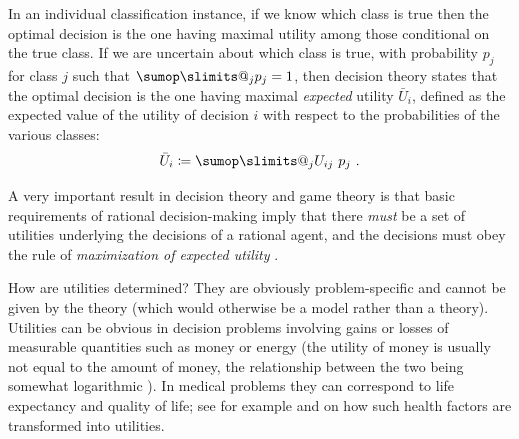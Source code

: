 \documentclass[\ifafour a4paper,12pt,\else a5paper,10pt,\fi%
onecolumn,oneside,article,%
british%
]{memoir}
\makeatletter
\theoremstyle{remark}
\theoremstyle{innote}
\def\sum{\DOTSI\sumop\slimits@}
\newcommand*{\defd}{\coloneqq}
\newcommand*{\p}{\mathrm{p}}%
\renewcommand*{\|}[1][]{\nonscript\:#1\vert\nonscript\:\mathopen{}}
\newcommand*{\sect}{\S}%
\newcommand*{\chap}{ch.}%
\newcommand*{\chaps}{chs}%
\newcommand*{\eg}{{e.g.}}
\newcommand*{\eu}{\bar{U}}
\newcommand*{\nd}{n_{\textrm{d}}}
\makeatother
\begin{document}
In an individual classification instance, if we know which class is true then the optimal decision is the one having maximal utility among those conditional on the true class. If we are uncertain about which class is true, with probability $p_{j}$ for class $j$ such that $\sum_{j}p_{j}=1$, then decision theory states that the optimal decision is the one having maximal \emph{expected} utility $\eu_{i}$, defined as the expected value of the utility of decision $i$ with respect to the probabilities of the various classes:
\begin{equation}
  \label{eq:exp_utility}
  \eu_{i} \defd \sum_{j} U_{ij}\ p_{j} \ .
\end{equation}


A very important result in decision theory and game theory is that basic requirements of rational decision-making imply that there \emph{must} be a set of utilities underlying the decisions of a rational agent, and the decisions must obey the rule of \emph{maximization of expected utility} \autocites[\sect~15.2]{russelletal1995_r2022}[\chaps~2--3]{neumannetal1944_r1955}.

How are utilities determined? They are obviously problem-specific and cannot be given by the theory (which would otherwise be a model rather than a theory). Utilities can be obvious in decision problems involving gains or losses of measurable quantities such as money or energy (the utility of money is usually not equal to the amount of money, the relationship between the two being somewhat logarithmic \autocites[\eg][pp.~203--204]{north1968}[\chap~4]{raiffa1968_r1970}). In medical problems they can correspond to life expectancy and quality of life; see for example \textcite[esp. \chap~8]{soxetal1988_r2013} and \textcite[esp. \chap~4]{huninketal2001_r2014} on how such health factors are transformed into utilities.
\end{document}
